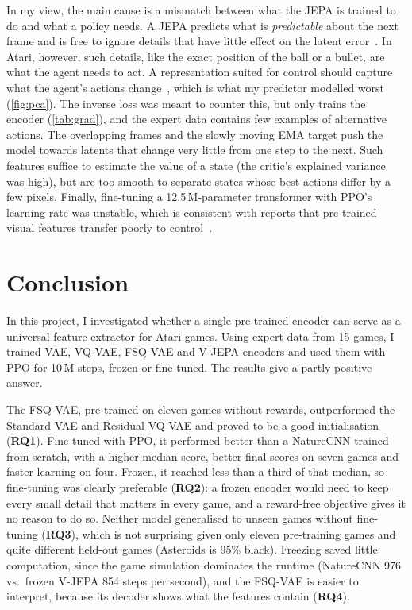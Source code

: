 \documentclass[runningheads]{llncs}
\begin{document}
In my view, the main cause is a mismatch between what the JEPA is trained to do and what a
policy needs. A JEPA predicts what is \emph{predictable} about the next frame and is free to
ignore details that have little effect on the latent error~\cite{lecun2022path,assran2023ijepa}.
In Atari, however, such details, like the exact position of the ball or a bullet, are what the
agent needs to act. A representation suited for control should
capture what the agent's actions change~\cite{gelada2019deepmdp}, which is what my predictor modelled worst (\cref{fig:pca}). The inverse loss was meant to counter this, but only trains the encoder (\cref{tab:grad}), and the expert data contains few examples of
alternative actions. The overlapping frames and the slowly moving EMA target push
the model towards latents that change very little from one step to the next. Such features suffice to estimate the value of a state (the critic's explained variance was high), but are too smooth to separate states whose best actions differ by a few pixels. Finally,
fine-tuning a 12.5\,M-parameter transformer with PPO's learning rate was unstable, which is
consistent with reports that pre-trained visual features transfer poorly to
control~\cite{hansen2022pretrained,parisi2022pvr}.

\FloatBarrier
\section{Conclusion}
\label{sec:conclusion}

In this project, I investigated whether a single pre-trained encoder can serve as a universal
feature extractor for Atari games. Using expert data from 15 games, I trained VAE, VQ-VAE,
FSQ-VAE and V-JEPA encoders and used them with PPO for 10\,M steps, frozen or fine-tuned.
The results give a partly positive answer.

The FSQ-VAE, pre-trained on eleven games without rewards, outperformed the Standard VAE and Residual VQ-VAE and proved to be a good initialisation
(\textbf{RQ1}). Fine-tuned with PPO, it performed better than a NatureCNN trained from scratch,
with a higher median score, better final scores on seven games and faster learning on four.
Frozen, it reached less than a third of that median, so fine-tuning was clearly preferable
(\textbf{RQ2}): a frozen encoder would need to keep every small detail that matters in every
game, and a reward-free objective gives it no reason to do so. Neither model generalised to
unseen games without fine-tuning (\textbf{RQ3}), which is not surprising given only eleven
pre-training games and quite different held-out games (Asteroids is 95\% black). Freezing
saved little computation, since the game simulation dominates the runtime (NatureCNN 976 vs.\
frozen V-JEPA 854 steps per second), and the FSQ-VAE is easier to interpret, because its decoder
shows what the features contain (\textbf{RQ4}).
\end{document}
